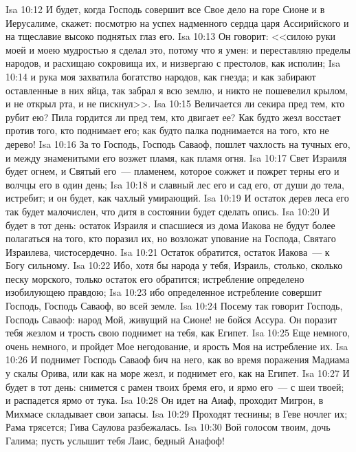 \vs Isa 10:12 И будет, когда Господь совершит все Свое дело на горе Сионе и в Иерусалиме, скажет: посмотрю на успех надменного сердца царя Ассирийского и на тщеславие высоко поднятых глаз его.
\vs Isa 10:13 Он говорит: <<силою руки моей и моею мудростью я сделал это, потому что я умен: и переставляю пределы народов, и расхищаю сокровища их, и низвергаю с престолов, как исполин;
\vs Isa 10:14 и рука моя захватила богатство народов, как гнезда; и как забирают оставленные в них яйца, так забрал я всю землю, и никто не пошевелил крылом, и не открыл рта, и не пискнул>>.
\vs Isa 10:15 Величается ли секира пред тем, кто рубит ею? Пила гордится ли пред тем, кто двигает ее? Как будто жезл восстает против того, кто поднимает его; как будто палка поднимается на того, кто не дерево!
\vs Isa 10:16 За то Господь, Господь Саваоф, пошлет чахлость на тучных его, и между знаменитыми его возжет пламя, как пламя огня.
\vs Isa 10:17 Свет Израиля будет огнем, и Святый его~--- пламенем, которое сожжет и пожрет терны его и волчцы его в один день;
\vs Isa 10:18 и славный лес его и сад его, от души до тела, истребит; и он будет, как чахлый умирающий.
\vs Isa 10:19 И остаток дерев леса его так будет малочислен, что дитя в состоянии будет сделать опись.
\rsbpar\vs Isa 10:20 И будет в тот день: остаток Израиля и спасшиеся из дома Иакова не будут более полагаться на того, кто поразил их, но возложат упование на Господа, Святаго Израилева, чистосердечно.
\vs Isa 10:21 Остаток обратится, остаток Иакова~--- к Богу сильному.
\vs Isa 10:22 Ибо, хотя бы народа у тебя, Израиль,  столько, сколько песку морского, только остаток его обратится; истребление определено изобилующею правдою;
\vs Isa 10:23 ибо определенное истребление совершит Господь, Господь Саваоф, во всей земле.
\vs Isa 10:24 Посему так говорит Господь, Господь Саваоф: народ Мой, живущий на Сионе! не бойся Ассура. Он поразит тебя жезлом и трость свою поднимет на тебя, как Египет.
\vs Isa 10:25 Еще немного, очень немного, и пройдет Мое негодование, и ярость Моя  на истребление их.
\vs Isa 10:26 И поднимет Господь Саваоф бич на него, как во время поражения Мадиама у скалы Орива, или как  на море жезл, и поднимет его, как на Египет.
\vs Isa 10:27 И будет в тот день: снимется с рамен твоих бремя его, и ярмо его~--- с шеи твоей; и распадется ярмо от тука.
\vs Isa 10:28 Он идет на Аиаф, проходит Мигрон, в Михмасе складывает свои запасы.
\vs Isa 10:29 Проходят теснины; в Геве ночлег их; Рама трясется; Гива Саулова разбежалась.
\vs Isa 10:30 Вой голосом твоим, дочь Галима; пусть услышит тебя Лаис, бедный Анафоф!
